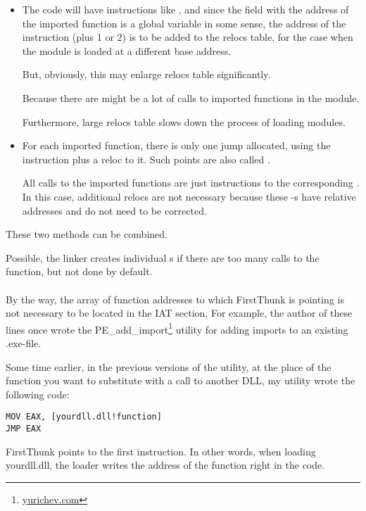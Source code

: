 \begin{itemize}
\item The code will have instructions like , 
and since the field with the address of the imported function is a global variable in some sense, 
the address of the  instruction (plus 1 or 2) is to be added to the relocs table,
for the case when the module is loaded at a different base address.

But, obviously, this may enlarge relocs table significantly.

Because there are might be a lot of calls to imported functions in the module.

Furthermore, large relocs table slows down the process of loading modules.

\item For each imported function, there is only one jump allocated, using the \JMP instruction 
plus a reloc to it.
Such points are also called .

All calls to the imported functions are just \CALL instructions to the corresponding .
In this case, additional relocs are not necessary because these \CALL{}-s
have relative addresses and do not need to be corrected.
\end{itemize}

These two methods can be combined.

Possible, the linker creates individual s if there are too many calls to the function,
but not done by default. \\
\\
By the way, the array of function addresses to which FirstThunk is pointing is not necessary to be located in the \ac{IAT} section.
For example, the author of these lines once wrote the PE\_add\_import\footnote{\href{http://go.yurichev.com/17049}{yurichev.com}} 
utility for adding imports to an existing .exe-file.

Some time earlier, in the previous versions of the utility, 
at the place of the function you want to substitute with a call to another DLL,
my utility wrote the following code:

\begin{lstlisting}
MOV EAX, [yourdll.dll!function]
JMP EAX
\end{lstlisting}

FirstThunk points to the first instruction. In other words, when loading yourdll.dll,
the loader writes the address of the  function right in the code.


